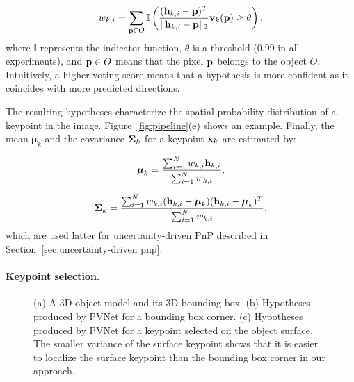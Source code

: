 \documentclass[10pt,twocolumn,letterpaper]{article}
\begin{document}
\begin{equation}
	w_{k,i} = \sum\limits_{{\bf p}\in O} \mathbb{I} \left( \frac{({\bf h}_{k,i} - {\bf p})^T}{\|{\bf h}_{k,i} - {\bf p}\|_2} {\bf v}_k({\bf p}) \ge \theta \right),
\end{equation}
where $\mathbb{I}$ represents the indicator function, $\theta$ is a threshold (0.99 in all experiments), and ${\bf p} \in O$ means that the pixel $\bf p$ belongs to the object $O$. Intuitively, a higher voting score means that a hypothesis is more confident as it coincides with more predicted directions.

The resulting hypotheses characterize the spatial probability distribution of a keypoint in the image. Figure~\ref{fig:pipeline}(e) shows an example.  
Finally, the mean ${\boldsymbol \mu_k}$ and the covariance ${\bf \Sigma}_k$ for a keypoint ${\bf x}_k$ are estimated by:

\begin{equation}
	{\bf \boldsymbol\mu}_k = \frac{ \sum_{i=1}^{N} w_{k,i}{\bf h}_{k,i}}{\sum_{i=1}^{N} w_{k,i}},
\end{equation}

\begin{equation}
	{\bf \Sigma}_k = \frac{\sum_{i=1}^{N} w_{k,i}({\bf h}_{k,i} - {\bf \boldsymbol\mu}_k)({\bf h}_{k,i} - {\bf \boldsymbol\mu}_k)^T}{\sum_{i=1}^{N} w_{k,i}},
\end{equation}
which are used latter for uncertainty-driven PnP described in Section~\ref{sec:uncertainty-driven pnp}.



\paragraph{Keypoint selection.}
\label{sec:keypoint selection}

\begin{figure} 
  \centering 
  \vspace{2mm}
  \caption{(a) A 3D object model and its 3D bounding box. (b) Hypotheses produced by PVNet for a bounding box corner. (c) Hypotheses produced by PVNet for a keypoint selected on the object surface. The smaller variance of the surface keypoint shows that it is easier to localize the surface keypoint than the bounding box corner in our approach.
}
  \label{fig:keypoints_selection}
  \vspace{-4mm}
\end{figure}
 
\end{document}
